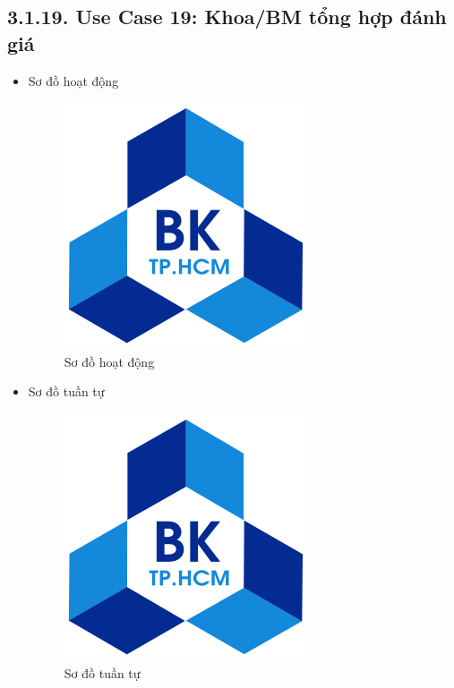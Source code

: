 \subsection*{3.1.19. Use Case 19: Khoa/BM tổng hợp đánh giá}
\begin{itemize}
    \item Sơ đồ hoạt động
    \begin{figure}[H]
    \centering
    \includegraphics[scale=0.5 ]{Picture/hcmut.png}
    \caption{Sơ đồ hoạt động }
    \end{figure}
    \item Sơ đồ tuần tự
    \begin{figure}[H]
    \centering
    \includegraphics[scale=0.5 ]{Picture/hcmut.png}
    \caption{Sơ đồ tuần tự }
    \end{figure}
\end{itemize}
